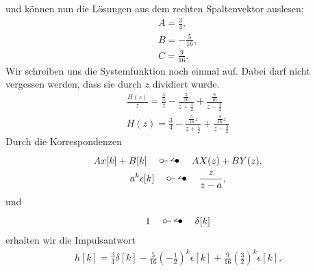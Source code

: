\documentclass[11pt,a4paper,DIV=12]{scrartcl}
\begin{document}
%
%
%
und können nun die Lösungen aus dem rechten Spaltenvektor auslesen:
%
\begin{gather}
	A=\frac{3}{4},\\
	B=-\frac{5}{16},\\
	C=\frac{9}{16}.
\end{gather}
%
Wir schreiben uns die Systemfunktion noch einmal auf. 
%
Dabei darf nicht vergessen werden, dass sie durch $z$ dividiert wurde.
%
\begin{gather}
	\frac{H(z)}{z}=
	\frac{\frac{3}{4}}{z} - \frac{\frac{5}{16}}{z+\frac{1}{2}} + \frac{\frac{9}{16}}{z-\frac{3}{2}}\\
	H(z) =\frac{3}{4} - \frac{\frac{5}{16} z}{z+\frac{1}{2}} + \frac{\frac{9}{16} z}{z-\frac{3}{2}}
\end{gather}
%
Durch die Korrespondenzen
%
\begin{gather}
	Ax[k]+B[k]\quad\ztransf\quad AX(z)+BY(z),\\
	a^k\epsilon[k]\quad\ztransf\quad \frac{z}{z-a},
\end{gather}
%
und
%
\begin{gather}
	1\quad\ztransf\quad \delta[k]
\end{gather}
%
erhalten wir die Impulsantwort
%
\begin{gather}
	h[k] = 
	\frac{3}{4} \delta[k] - \frac{5}{16}\left(-\frac{1}{2}\right)^k \epsilon[k] + \frac{9}{16}\left(\frac{3}{2}\right)^k \epsilon[k].
\end{gather}
%
\newpage
\end{document}
